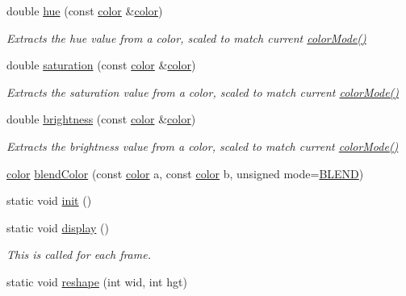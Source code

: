 \begin{DoxyCompactItemize}
double \hyperlink{namespacecprocessing_aac8de1d2f07f4736e63081ef536e8b67}{hue} (const \hyperlink{classcprocessing_1_1color}{color} \&\hyperlink{classcprocessing_1_1color}{color})
\begin{DoxyCompactList}\small\item\em \-Extracts the hue value from a color, scaled to match current \hyperlink{namespacecprocessing_aa2b11af6c6cb096d02a9fb39b6f5a54d}{color\-Mode()} \end{DoxyCompactList}\item 
double \hyperlink{namespacecprocessing_af0da26f695cba41e019675886efab315}{saturation} (const \hyperlink{classcprocessing_1_1color}{color} \&\hyperlink{classcprocessing_1_1color}{color})
\begin{DoxyCompactList}\small\item\em \-Extracts the saturation value from a color, scaled to match current \hyperlink{namespacecprocessing_aa2b11af6c6cb096d02a9fb39b6f5a54d}{color\-Mode()} \end{DoxyCompactList}\item 
double \hyperlink{namespacecprocessing_aed4f50cfde420a3f42922bbf2b7cbf99}{brightness} (const \hyperlink{classcprocessing_1_1color}{color} \&\hyperlink{classcprocessing_1_1color}{color})
\begin{DoxyCompactList}\small\item\em \-Extracts the brightness value from a color, scaled to match current \hyperlink{namespacecprocessing_aa2b11af6c6cb096d02a9fb39b6f5a54d}{color\-Mode()} \end{DoxyCompactList}\item 
\hyperlink{classcprocessing_1_1color}{color} \hyperlink{namespacecprocessing_a516a53b120765fdff7ecfc9130161e4c}{blend\-Color} (const \hyperlink{classcprocessing_1_1color}{color} a, const \hyperlink{classcprocessing_1_1color}{color} b, unsigned mode=\hyperlink{namespacecprocessing_aa210740653d5e2431db0bdc726242fb0a3d9a0443c8bb0e322801ca6a30dc947c}{\-B\-L\-E\-N\-D})
\item 
static void \hyperlink{namespacecprocessing_aedf10deb692c297efc2503be0912ed80}{init} ()
\item 
static void \hyperlink{namespacecprocessing_af7b4aa3cb0e99e28bb594e3ae3902f7e}{display} ()
\begin{DoxyCompactList}\small\item\em \-This is called for each frame. \end{DoxyCompactList}\item 
static void \hyperlink{namespacecprocessing_abd5e7982fdc62b80db5019ea6ebf97a9}{reshape} (int wid, int hgt)

\end{DoxyCompactItemize}
